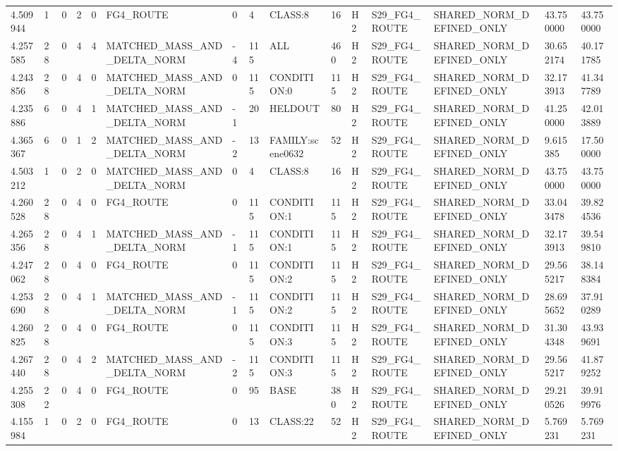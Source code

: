 \begin{tabular}{lllllllllllllll}
4.509944 & 1 & 0 & 2 & 0 & FG4\_ROUTE & 0 & 4 & CLASS:8 & 16 & H2 & S29\_FG4\_ROUTE & SHARED\_NORM\_DEFINED\_ONLY & 43.750000 & 43.750000 \\
4.257585 & 28 & 0 & 4 & 4 & MATCHED\_MASS\_AND\_DELTA\_NORM & -4 & 115 & ALL & 460 & H2 & S29\_FG4\_ROUTE & SHARED\_NORM\_DEFINED\_ONLY & 30.652174 & 40.171785 \\
4.243856 & 28 & 0 & 4 & 0 & MATCHED\_MASS\_AND\_DELTA\_NORM & 0 & 115 & CONDITION:0 & 115 & H2 & S29\_FG4\_ROUTE & SHARED\_NORM\_DEFINED\_ONLY & 32.173913 & 41.347789 \\
4.235886 & 6 & 0 & 4 & 1 & MATCHED\_MASS\_AND\_DELTA\_NORM & -1 & 20 & HELDOUT & 80 & H2 & S29\_FG4\_ROUTE & SHARED\_NORM\_DEFINED\_ONLY & 41.250000 & 42.013889 \\
4.365367 & 6 & 0 & 1 & 2 & MATCHED\_MASS\_AND\_DELTA\_NORM & -2 & 13 & FAMILY:scene0632 & 52 & H2 & S29\_FG4\_ROUTE & SHARED\_NORM\_DEFINED\_ONLY & 9.615385 & 17.500000 \\
4.503212 & 1 & 0 & 2 & 0 & MATCHED\_MASS\_AND\_DELTA\_NORM & 0 & 4 & CLASS:8 & 16 & H2 & S29\_FG4\_ROUTE & SHARED\_NORM\_DEFINED\_ONLY & 43.750000 & 43.750000 \\
4.260528 & 28 & 0 & 4 & 0 & FG4\_ROUTE & 0 & 115 & CONDITION:1 & 115 & H2 & S29\_FG4\_ROUTE & SHARED\_NORM\_DEFINED\_ONLY & 33.043478 & 39.824536 \\
4.265356 & 28 & 0 & 4 & 1 & MATCHED\_MASS\_AND\_DELTA\_NORM & -1 & 115 & CONDITION:1 & 115 & H2 & S29\_FG4\_ROUTE & SHARED\_NORM\_DEFINED\_ONLY & 32.173913 & 39.549810 \\
4.247062 & 28 & 0 & 4 & 0 & FG4\_ROUTE & 0 & 115 & CONDITION:2 & 115 & H2 & S29\_FG4\_ROUTE & SHARED\_NORM\_DEFINED\_ONLY & 29.565217 & 38.148384 \\
4.253690 & 28 & 0 & 4 & 1 & MATCHED\_MASS\_AND\_DELTA\_NORM & -1 & 115 & CONDITION:2 & 115 & H2 & S29\_FG4\_ROUTE & SHARED\_NORM\_DEFINED\_ONLY & 28.695652 & 37.910289 \\
4.260825 & 28 & 0 & 4 & 0 & FG4\_ROUTE & 0 & 115 & CONDITION:3 & 115 & H2 & S29\_FG4\_ROUTE & SHARED\_NORM\_DEFINED\_ONLY & 31.304348 & 43.939691 \\
4.267440 & 28 & 0 & 4 & 2 & MATCHED\_MASS\_AND\_DELTA\_NORM & -2 & 115 & CONDITION:3 & 115 & H2 & S29\_FG4\_ROUTE & SHARED\_NORM\_DEFINED\_ONLY & 29.565217 & 41.879252 \\
4.255308 & 22 & 0 & 4 & 0 & FG4\_ROUTE & 0 & 95 & BASE & 380 & H2 & S29\_FG4\_ROUTE & SHARED\_NORM\_DEFINED\_ONLY & 29.210526 & 39.919976 \\
4.155984 & 1 & 0 & 2 & 0 & FG4\_ROUTE & 0 & 13 & CLASS:22 & 52 & H2 & S29\_FG4\_ROUTE & SHARED\_NORM\_DEFINED\_ONLY & 5.769231 & 5.769231 \\

\end{tabular}
